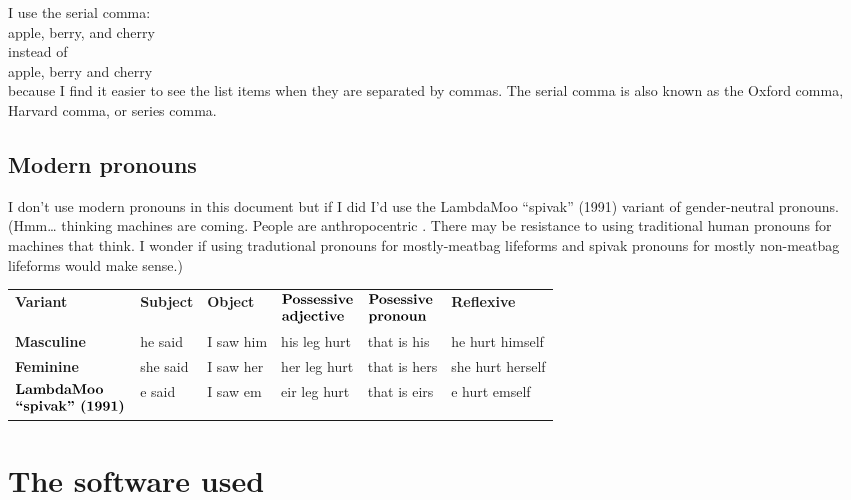 I use the serial comma:\\
   apple, berry, and cherry\\
instead of\\
   apple, berry and cherry\\
because I find it easier
to see the list items
when they are separated by commas.
The serial comma is also known as the
Oxford comma,
Harvard comma,
or series comma.


\subsection{Modern pronouns}

I don't use modern pronouns in this document
but if I did I'd use the LambdaMoo ``spivak'' (1991)
\cite{spivak-pronoun}
variant of gender-neutral pronouns.
(Hmm\ldots
thinking machines are coming.
People are anthropocentric \cite{merriam-webster-anthropocentric}.
There may be resistance to
using traditional human pronouns
for machines that think.
I wonder if using tradutional
pronouns for mostly-meatbag lifeforms
and spivak pronouns for mostly non-meatbag
lifeforms would make sense.)

\vspace{6pt}
{
  \let\B=\bfseries
  \begin{tabular}{llllll}
    \B Variant&
      \B Subject&
      \B Object&
      \(\vcenter{%
        \hbox{\strut\B Possessive}
        \hbox{\strut\B adjective}
      }\)&
      \(\vcenter{%
        \hbox{\strut\B Posessive}
        \hbox{\strut\B pronoun}}\)&
      \B Reflexive\\[18pt]
    \B Masculine&
      he said&
      I saw him&
      his leg hurt&
      that is his&
      he hurt himself\\[6pt]
    \B Feminine&
      she said&
      I saw her&
      her leg hurt&
      that is hers&
      she hurt herself\\[6pt]
    \(\vcenter{%
      \hbox{\strut\B LambdaMoo}
      \hbox{\strut\B ``spivak'' (1991)}
    }\)&
      e said&
      I saw em&
      eir leg hurt&
      that is eirs&
      e hurt emself\\
  \end{tabular}
}
\vspace{6pt}


\section{The software used}

